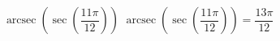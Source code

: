  {$\operatorname{arcsec}\left(\sec\left(\dfrac{11\pi}{12}\right) \right)$}
{ $\operatorname{arcsec}\left(\sec\left(\dfrac{11\pi}{12}\right) \right) = \dfrac{13\pi}{12}$}
